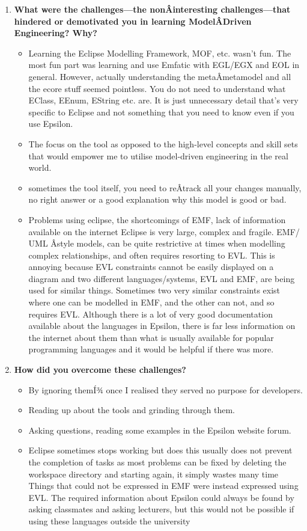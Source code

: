 \documentclass[12pt, a4paper]{report} \usepackage[titletoc]{appendix}
\begin{document}
\begin{appendices}
\begin{enumerate}
\item \textbf{ What were the challenges---the nonÂ­interesting challenges---that hindered or demotivated you in learning ModelÂ­Driven Engineering? Why?}
\begin{itemize}
\item Learning the Eclipse Modelling Framework, MOF, etc. wasn't fun. The most fun part was learning and use Emfatic with EGL/EGX and EOL in general. However, actually understanding the metaÂ­metamodel and all the ecore stuff seemed pointless. You do not need to understand what EClass, EEnum, EString etc. are. It is just unnecessary detail that's very specific to
Eclipse and not something that you need to know even if you use Epsilon.
\item The focus on the tool as opposed to the high-level concepts and skill sets that would empower me to utilise model-driven engineering in the real world.
\item sometimes the tool itself, you need to reÂ­track all your changes manually, no right answer or a good explanation why this model is good or bad.
\item Problems using eclipse, the shortcomings of EMF, lack of information available on the internet Eclipse is very large, complex and fragile. EMF/ UML Â­style models, can be quite restrictive at times when modelling complex relationships, and often requires resorting to EVL. This is annoying because EVL constraints cannot be easily displayed on a diagram and two different languages/systems, EVL and EMF, are being used for similar things. Sometimes two very similar constraints exist where one can be modelled in EMF, and the other can not, and so requires EVL. Although there is a lot of very good documentation available about the languages in Epsilon, there is far less information on the internet about them than what is usually available for popular programming languages and it would be helpful if there was more.
\end{itemize}

\item \textbf{How did you overcome these challenges?}
\begin{itemize}
\item By ignoring themÍ¾ once I realised they served no purpose for developers.
\item Reading up about the tools and grinding through them.
\item Asking questions, reading some examples in the Epsilon website forum.
\item Eclipse sometimes stops working but does this usually does not prevent the completion of tasks as most problems can be fixed by deleting the workspace directory and starting again, it simply wastes many time Things that could not be expressed in EMF were instead expressed using EVL. The required information about Epsilon could always be found by
asking classmates and asking lecturers, but this would not be possible if using these languages outside the university
\end{itemize}
\end{enumerate}


\end{appendices}
\end{document}
